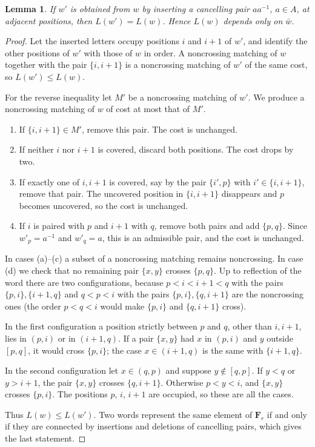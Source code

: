 \documentclass[11pt]{amsart}
\newtheorem{lemma}[theorem]{Lemma}
\theoremstyle{definition}
\theoremstyle{remark}
\numberwithin{equation}{section}
\newcommand{\F}{\mathbf F}
\begin{document}
\begin{lemma}\label{lem:reduction}
If $w'$ is obtained from $w$ by inserting a cancelling pair $aa^{-1}$, $a\in A$, at adjacent positions, then $L(w')=L(w)$. Hence $L(w)$ depends only on $\bar w$.
\end{lemma}

\begin{proof}
Let the inserted letters occupy positions $i$ and $i+1$ of $w'$, and identify the other positions of $w'$ with those of $w$ in order. A noncrossing matching of $w$ together with the pair $\{i,i+1\}$ is a noncrossing matching of $w'$ of the same cost, so $L(w')\le L(w)$.

For the reverse inequality let $M'$ be a noncrossing matching of $w'$. We produce a noncrossing matching of $w$ of cost at most that of $M'$.
\begin{enumerate}[label=(\alph*)]
\item If $\{i,i+1\}\in M'$, remove this pair. The cost is unchanged.
\item If neither $i$ nor $i+1$ is covered, discard both positions. The cost drops by two.
\item If exactly one of $i,i+1$ is covered, say by the pair $\{i',p\}$ with $i'\in\{i,i+1\}$, remove that pair. The uncovered position in $\{i,i+1\}$ disappears and $p$ becomes uncovered, so the cost is unchanged.
\item If $i$ is paired with $p$ and $i+1$ with $q$, remove both pairs and add $\{p,q\}$. Since $w'_p=a^{-1}$ and $w'_q=a$, this is an admissible pair, and the cost is unchanged.
\end{enumerate}
In cases (a)--(c) a subset of a noncrossing matching remains noncrossing. In case (d) we check that no remaining pair $\{x,y\}$ crosses $\{p,q\}$. Up to reflection of the word there are two configurations, because $p<i<i+1<q$ with the pairs $\{p,i\},\{i+1,q\}$ and $q<p<i$ with the pairs $\{p,i\},\{q,i+1\}$ are the noncrossing ones (the order $p<q<i$ would make $\{p,i\}$ and $\{q,i+1\}$ cross).

In the first configuration a position strictly between $p$ and $q$, other than $i,i+1$, lies in $(p,i)$ or in $(i+1,q)$. If a pair $\{x,y\}$ had $x$ in $(p,i)$ and $y$ outside $[p,q]$, it would cross $\{p,i\}$; the case $x\in(i+1,q)$ is the same with $\{i+1,q\}$.

In the second configuration let $x\in(q,p)$ and suppose $y\notin[q,p]$. If $y<q$ or $y>i+1$, the pair $\{x,y\}$ crosses $\{q,i+1\}$. Otherwise $p<y<i$, and $\{x,y\}$ crosses $\{p,i\}$. The positions $p$, $i$, $i+1$ are occupied, so these are all the cases.

Thus $L(w)\le L(w')$. Two words represent the same element of $\F_r$ if and only if they are connected by insertions and deletions of cancelling pairs, which gives the last statement.
\end{proof}
\end{document}
